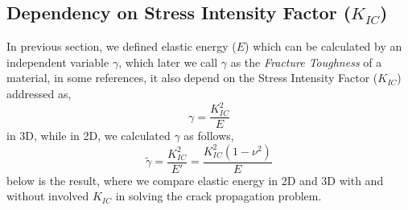 \documentclass[a4paper,11pt]{article}
\begin{document}
\subsection{Dependency on Stress Intensity Factor ($K_{IC}$)}
In previous section, we defined elastic energy ($E$) which can be calculated by an independent variable $\gamma$, which later we call $\gamma$ as the \textit{Fracture Toughness} of a material, in some references, it also depend on the Stress Intensity Factor ($K_{IC}$) addressed as,
\begin{equation*}
\gamma = \frac{K_{IC}^2}{E}
\end{equation*}
in 3D, while in 2D, we calculated $\gamma$ as follows,
\begin{equation*}
\tilde{\gamma} = \frac{K_{IC}^2}{E'} = \frac{K_{IC}^2(1-\nu^2)}{E}
\end{equation*}
below is the result, where we compare elastic energy in 2D and 3D with and without involved $K_{IC}$ in solving the crack propagation problem.
\end{document}
